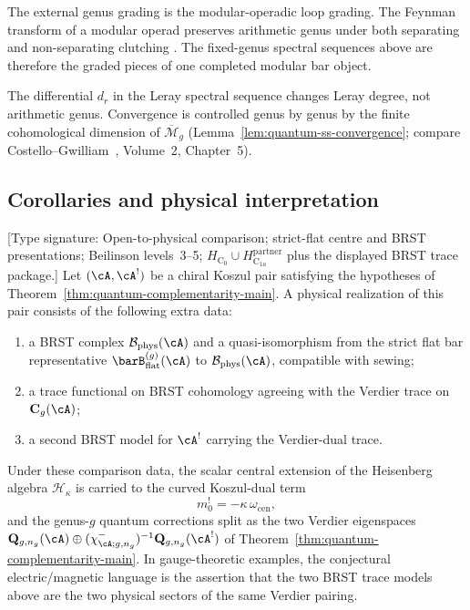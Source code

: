 \begin{remark}\label{rem:ss-feynman}
The external genus grading is the modular-operadic loop grading.
The Feynman transform of a modular operad preserves arithmetic
genus under both separating and non-separating clutching
\cite{Kon99}. The fixed-genus spectral sequences above are therefore
the graded pieces of one completed modular bar object.
\end{remark}

\begin{remark}\label{rem:genus-spectral-connection}
The differential $d_r$ in the Leray spectral sequence changes Leray
degree, not arithmetic genus. Convergence is controlled genus by
genus by the finite cohomological dimension of
$\overline{\mathcal{M}}_g$
(Lemma~\ref{lem:quantum-ss-convergence}; compare
Costello--Gwilliam~\cite{CG17}, Volume~2, Chapter~5).
\end{remark}

\subsection{Corollaries and physical interpretation}

\begin{conjecture}
\label{conj:physical-complementarity}
\textup{[Type signature: Open-to-physical comparison; strict-flat
centre and BRST presentations; Beilinson levels~3--5;
\(H_{\mathrm C_0}\cup H_{\mathrm C_{1a}}^{\mathrm{partner}}\)
plus the displayed BRST trace package.]}
Let $(\cA,\cA^!)$ be a chiral Koszul pair satisfying the hypotheses of
Theorem~\ref{thm:quantum-complementarity-main}. A physical
realization of this pair consists of the following extra data:
\begin{enumerate}[label=\textup{(\roman*)}]
\item a BRST complex $\mathcal B_{\mathrm{phys}}(\cA)$ and a
 quasi-isomorphism from the strict flat bar representative
 $\barB^{(g)}_{\mathrm{flat}}(\cA)$ to
 $\mathcal B_{\mathrm{phys}}(\cA)$, compatible with sewing;
\item a trace functional on BRST cohomology agreeing with the
 Verdier trace on $\mathbf C_g(\cA)$;
\item a second BRST model for $\cA^!$ carrying the Verdier-dual
 trace.
\end{enumerate}
Under these comparison data, the scalar central extension of the
Heisenberg algebra $\mathcal H_\kappa$ is carried to the curved
Koszul-dual term
\[
m_0^! = -\kappa\,\omega_{\mathrm{cen}},
\]
and the genus-$g$ quantum corrections split as the two Verdier
eigenspaces
$\mathbf Q_{g,n_g}(\cA)\oplus
(\chi^-_{\cA;g,n_g})^{-1}\mathbf Q_{g,n_g}(\cA^!)$ of
Theorem~\ref{thm:quantum-complementarity-main}. In gauge-theoretic
examples, the conjectural electric/magnetic language is the assertion
that the two BRST trace models above are the two physical sectors of
the same Verdier pairing.
\end{conjecture}


